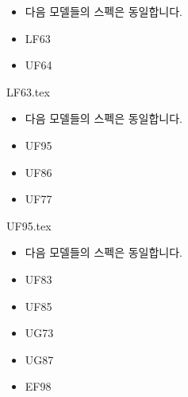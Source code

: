 \documentclass{beamer}
\begin{document}






\begin{frame}[t]{}
\tableofcontents
\huge
\begin{itemize}
\large \item 다음 모델들의 스펙은 동일합니다.
\huge \item LF63
\huge \item UF64
\end{itemize}
\end{frame}

{LF63.tex}


\begin{frame}[t]{}
\tableofcontents
\huge
\begin{itemize}
\large \item 다음 모델들의 스펙은 동일합니다.
\huge \item UF95
\huge \item UF86
\huge \item UF77
\end{itemize}
\end{frame}

{UF95.tex}


\begin{frame}[t]{}
\tableofcontents
\huge
\begin{itemize}
\large \item 다음 모델들의 스펙은 동일합니다.
\huge \item UF83
\huge \item UF85
\huge \item UG73
\huge \item UG87
\huge \item EF98
\end{itemize}
\end{frame}
\end{document}
